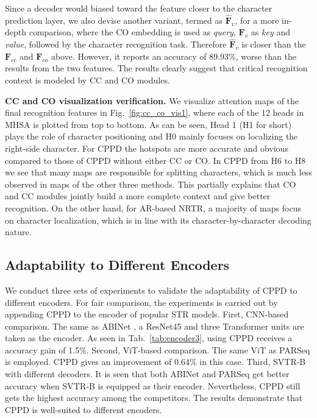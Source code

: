 \documentclass[10pt,journal,compsoc]{IEEEtran}
\begin{document}
Since a decoder would biased toward the feature closer to the character prediction layer, we also devise another variant, termed as $\mathbf{\hat{F}}_{v}$, for a more in-depth comparison, where the CO embedding is used as \emph{query}, $\mathbf{F}_{v}$ as \emph{key} and \emph{value}, followed by the character recognition task. Therefore $\mathbf{\hat{F}}_{v}$ is closer than the $\mathbf{F}_{cc}$ and $\mathbf{F}_{co}$ above. However, it reports an accuracy of 89.93\%, worse than the results from the two features. The results clearly suggest that critical recognition context is modeled by CC and CO modules. 

\noindent\textbf{CC and CO visualization verification.}
We visualize attention maps of the final recognition features in Fig.~\ref{fig:cc_co_vis1}, where each of the 12 heads in MHSA is plotted from top to bottom. As can be seen, Head 1 (H1 for short) plays the role of character positioning and H0 mainly focuses on localizing the right-side character. For CPPD the hotspots are more accurate and obvious compared to those of CPPD without either CC or CO. In CPPD from H6 to H8 we see that many maps are responsible for splitting characters, which is much less observed in maps of the other three methods. This partially explains that CO and CC modules jointly build a more complete context and give better recognition. On the other hand, for AR-based NRTR, a majority of maps focus on character localization, which is in line with its character-by-character decoding nature.  

\subsection{Adaptability to Different Encoders}
We conduct three sets of experiments to validate the adaptability of CPPD to different encoders. For fair comparison, the experiments is carried out by appending CPPD to the encoder of popular STR models. First, CNN-based comparison. The same as ABINet \cite{fang2021abinet}, a ResNet45 and three Transformer units are taken as the encoder. As seen in Tab.~\ref{tab:encoder3}, using CPPD receives a accuracy gain of 1.5\%. Second, ViT-based comparison. The same ViT as PARSeq \cite{BautistaA22PARSeq} is employed. CPPD gives an improvement of 0.64\% in this case. Third, SVTR-B with different decoders. It is seen that both ABINet and PARSeq get better accuracy when SVTR-B is equipped as their encoder. Nevertheless, CPPD still gets the highest accuracy among the competitors. The results demonstrate that CPPD is well-suited to different encoders.
\end{document}
